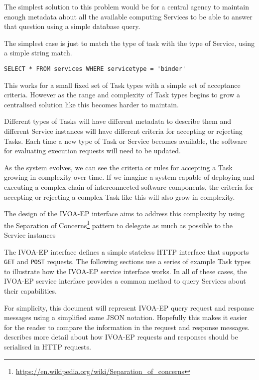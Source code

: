 \documentclass[11pt,a4paper]{ivoa}
\newcommand{\json} {JSON\xspace}
\newcommand{\ivoep} {IVOA-EP\xspace}
\newcommand{\codeword}[1] {\texttt{#1}}
\newcommand{\footurl}[1] {\footnote{\url{#1}}}
\begin{document}
The simplest solution to this problem would be for a central agency to maintain enough metadata about all the available computing Services to be able to answer that question using a simple database query.

The simplest case is just to match the type of task with the type of Service, using a simple string match.

\begin{verbatim}
SELECT * FROM services WHERE servicetype = 'binder'
\end{verbatim}

This works for a small fixed set of Task types with a simple set of acceptance criteria. However as the range and complexity of Task types begins to grow a centralised solution like this becomes harder to maintain.

Different types of Tasks will have different metadata to describe them and different Service instances will have different criteria for accepting or rejecting Tasks. Each time a new type of Task or Service becomes available, the software for evaluating execution requests will need to be updated.

As the system evolves, we can see the criteria or rules for accepting a Task growing in complexity over time. If we imagine a system capable of deploying and executing a complex chain of interconnected software components, the criteria for accepting or rejecting a complex Task like this will also grow in complexity.

The design of the \ivoep interface aims to address this complexity by using the Separation of Concerns\footurl{https://en.wikipedia.org/wiki/Separation_of_concerns} pattern to delegate as much as possible to the Service instances

The \ivoep interface defines a simple stateless HTTP interface that supports \codeword{GET} and \codeword{POST} requests.
The following sections use a series of example Task types to illustrate how the \ivoep service interface works.
In all of these cases, the \ivoep service interface provides a common method to query Services about their capabilities.   

For simplicity, this document will represent \ivoep query request and response messages using a simplified same \json notation.
Hopefully this makes it easier for the reader to compare the information in the request and response messages.
 describes more detail about how \ivoep requests and responses should be serialised in HTTP requests.
\end{document}
